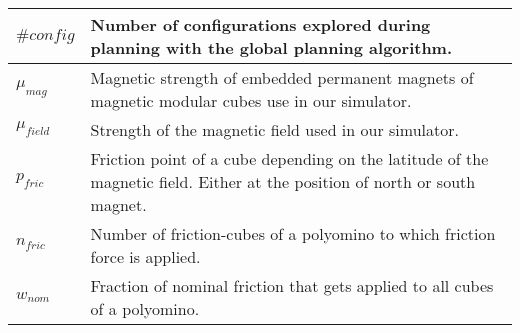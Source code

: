 \begin{xltabular}{\textwidth}{ l  X }
	$\#\textit{config}$
	&
	Number of configurations explored during planning with the global planning algorithm.
	\\ \midrule
	
	$\mu_\textit{mag}$
	&
	Magnetic strength of embedded permanent magnets of magnetic modular cubes use in our simulator.
	\\ \midrule
	
	$\mu_\textit{field}$
	&
	Strength of the magnetic field used in our simulator.
	\\ \midrule
	
	$p_\textit{fric}$
	&
	Friction point of a cube depending on the latitude of the magnetic field.
	Either at the position of north or south magnet.
	\\ \midrule
	
	$n_\textit{fric}$
	&
	Number of friction-cubes of a polyomino to which friction force is applied.
	\\ \midrule
	
	$w_\textit{nom}$
	&
	Fraction of nominal friction that gets applied to all cubes of a polyomino.
	\\ \bottomrule
	
\end{xltabular}